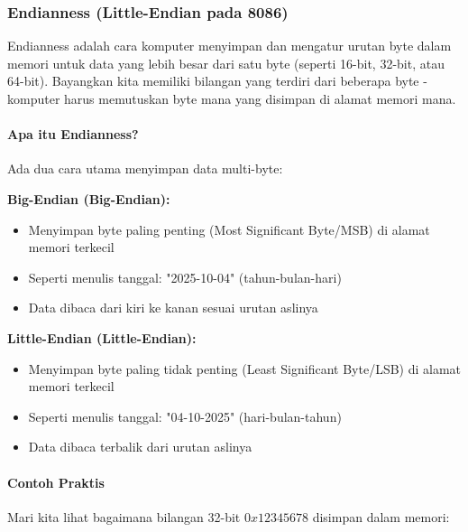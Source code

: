 \documentclass[../main.tex]{subfiles}
\begin{document}
        \subsubsection{Endianness (Little-Endian pada 8086)}

            Endianness adalah cara komputer menyimpan dan mengatur urutan byte dalam memori untuk data yang lebih besar dari satu byte (seperti 16-bit, 32-bit, atau 64-bit). Bayangkan kita memiliki bilangan yang terdiri dari beberapa byte - komputer harus memutuskan byte mana yang disimpan di alamat memori mana.

            \paragraph{Apa itu Endianness?}
                Ada dua cara utama menyimpan data multi-byte:

                \textbf{Big-Endian (Big-Endian):}
                \begin{itemize}
                    \item Menyimpan byte paling penting (Most Significant Byte/MSB) di alamat memori terkecil
                    \item Seperti menulis tanggal: "2025-10-04" (tahun-bulan-hari)
                    \item Data dibaca dari kiri ke kanan sesuai urutan aslinya
                \end{itemize}

                \textbf{Little-Endian (Little-Endian):}
                \begin{itemize}
                    \item Menyimpan byte paling tidak penting (Least Significant Byte/LSB) di alamat memori terkecil
                    \item Seperti menulis tanggal: "04-10-2025" (hari-bulan-tahun)
                    \item Data dibaca terbalik dari urutan aslinya
                \end{itemize}

            \paragraph{Contoh Praktis}
                Mari kita lihat bagaimana bilangan 32-bit \(0x12345678\) disimpan dalam memori:
\end{document}
